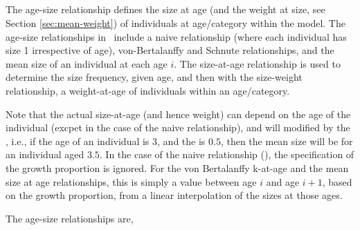 \subsection{\label{sec:size-at-age}}

The age-size relationship defines the size at age (and the weight at size, see Section \ref{sec:mean-weight}) of individuals at age/category within the model. The age-size relationships in \SPM\ include a naive relationship (where each individual has size 1 irrespective of age), von-Bertalanffy and Schnute relationships, and the mean size of an individual at each age $i$. The size-at-age relationship is used to determine the size frequency, given age, and then with the size-weight relationship, a weight-at-age of individuals within an age/category. 

Note that the actual size-at-age (and hence weight) can depend on the age of the individual (excpet in the case of the naive relationship), and will modified by the , i.e., if the age of an individual is $3$, and the  is $0.5$, then the mean size will be for an individual aged $3.5$. In the case of the naive relationship (), the specification of the growth proportion is ignored. For the von Bertalanffy k-at-age and the mean size at age relationships, this is simply a value between age $i$ and age $i+1$, based on the growth proportion, from a linear interpolation of the sizes at those ages.

The age-size relationships are,

